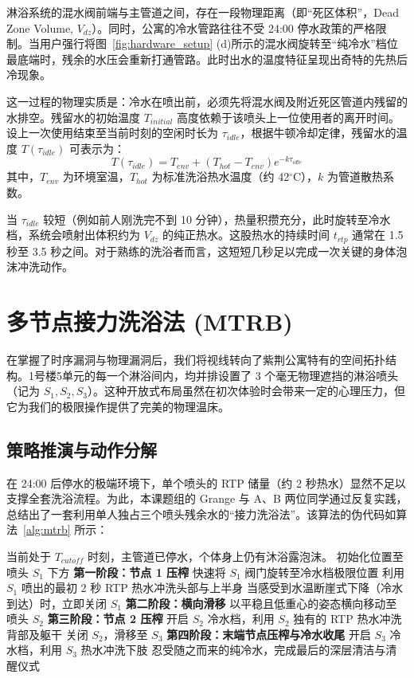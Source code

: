 ﻿\documentclass[10pt, conference, a4paper]{IEEEtran}
\begin{document}
淋浴系统的混水阀前端与主管道之间，存在一段物理距离（即“死区体积”，Dead Zone Volume, $V_{dz}$）。同时，公寓的冷水管路往往不受 24:00 停水政策的严格限制。当用户强行将图~\ref{fig:hardware_setup} (d)所示的混水阀旋转至“纯冷水”档位最底端时，残余的水压会重新打通管路。此时出水的温度特征呈现出奇特的先热后冷现象。

这一过程的物理实质是：冷水在喷出前，必须先将混水阀及附近死区管道内残留的水排空。残留水的初始温度 $T_{initial}$ 高度依赖于该喷头上一位使用者的离开时间。设上一次使用结束至当前时刻的空闲时长为 $\tau_{idle}$，根据牛顿冷却定律，残留水的温度 $T(\tau_{idle})$ 可表示为：
\begin{equation}
    T(\tau_{idle}) = T_{env} + (T_{hot} - T_{env}) e^{-k \tau_{idle}}
\end{equation}
其中，$T_{env}$ 为环境室温，$T_{hot}$ 为标准洗浴热水温度（约 42$^{\circ}$C），$k$ 为管道散热系数。

当 $\tau_{idle}$ 较短（例如前人刚洗完不到 10 分钟），热量积攒充分，此时旋转至冷水档，系统会喷射出体积约为 $V_{dz}$ 的纯正热水。这股热水的持续时间 $t_{rtp}$ 通常在 1.5 秒至 3.5 秒之间。对于熟练的洗浴者而言，这短短几秒足以完成一次关键的身体泡沫冲洗动作。

\section{多节点接力洗浴法 (MTRB)}

在掌握了时序漏洞与物理漏洞后，我们将视线转向了紫荆公寓特有的空间拓扑结构。1号楼5单元的每一个淋浴间内，均并排设置了 3 个毫无物理遮挡的淋浴喷头（记为 $S_1, S_2, S_3$）。这种开放式布局虽然在初次体验时会带来一定的心理压力，但它为我们的极限操作提供了完美的物理温床。

\subsection{策略推演与动作分解}
在 24:00 后停水的极端环境下，单个喷头的 RTP 储量（约 2 秒热水）显然不足以支撑全套洗浴流程。为此，本课题组的 Grange 与 A、B 两位同学通过反复实践，总结出了一套利用单人独占三个喷头残余水的“接力洗浴法”。该算法的伪代码如算法~\ref{alg:mtrb} 所示：

\begin{algorithm}
\caption{多节点接力洗浴算法 (MTRB)}
\begin{algorithmic}[1]
\REQUIRE 当前处于 $T_{cutoff}$ 时刻，主管道已停水，个体身上仍有沐浴露泡沫。
\STATE 初始化位置至喷头 $S_1$ 下方
\STATE \textbf{第一阶段：节点 1 压榨}
\STATE 快速将 $S_1$ 阀门旋转至冷水档极限位置
\STATE 利用 $S_1$ 喷出的最初 2 秒 RTP 热水冲洗头部与上半身
\STATE 当感受到水温断崖式下降（冷水到达）时，立即关闭 $S_1$
\STATE \textbf{第二阶段：横向滑移}
\STATE 以平稳且低重心的姿态横向移动至喷头 $S_2$
\STATE \textbf{第三阶段：节点 2 压榨}
\STATE 开启 $S_2$ 冷水档，利用 $S_2$ 独有的 RTP 热水冲洗背部及躯干
\STATE 关闭 $S_2$，滑移至 $S_3$
\STATE \textbf{第四阶段：末端节点压榨与冷水收尾}
\STATE 开启 $S_3$ 冷水档，利用 $S_3$ 热水冲洗下肢
\STATE 忍受随之而来的纯冷水，完成最后的深层清洁与清醒仪式
\end{algorithmic}
\label{alg:mtrb}
\end{algorithm}
\end{document}
